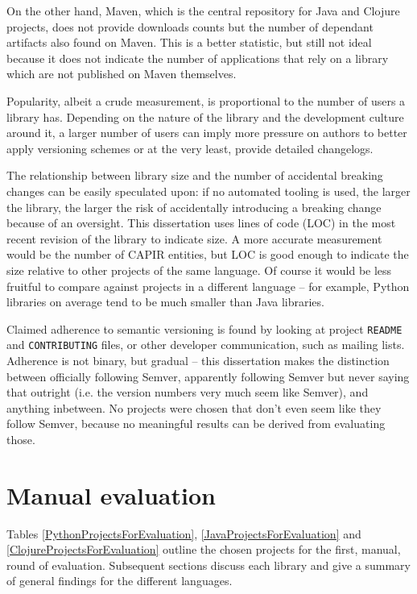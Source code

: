 \documentclass{l4proj}
\newcommand\genericstyle{\lstset{basicstyle=\ttm}}
\newcommand\codeinline[1]{{\genericstyle\lstinline!#1!}}
\begin{document}
On the other hand, Maven, which is the central repository for Java and
Clojure projects, does not provide downloads counts but the number of
dependant artifacts also found on Maven. This is a better statistic,
but still not ideal because it does not indicate the number of
applications that rely on a library which are not published on Maven
themselves.

Popularity, albeit a crude measurement, is proportional to the number
of users a library has. Depending on the nature of the library and the
development culture around it, a larger number of users can imply more
pressure on authors to better apply versioning schemes or at the very
least, provide detailed changelogs.

The relationship between library size and the number of accidental
breaking changes can be easily speculated upon: if no automated
tooling is used, the larger the library, the larger the risk of
accidentally introducing a breaking change because of an oversight.
This dissertation uses lines of code (LOC) in the most recent revision
of the library to indicate size. A more accurate measurement would be
the number of CAPIR entities, but LOC is good enough to indicate the
size relative to other projects of the same language. Of course it
would be less fruitful to compare against projects in a different
language -- for example, Python libraries on average tend to be much
smaller than Java libraries.

Claimed adherence to semantic versioning is found by looking at
project \codeinline{README} and \codeinline{CONTRIBUTING} files, or
other developer communication, such as mailing lists. Adherence is not
binary, but gradual -- this dissertation makes the distinction between
officially following Semver, apparently following Semver but never
saying that outright (i.e. the version numbers very much seem like
Semver), and anything inbetween. No projects were chosen that don't
even seem like they follow Semver, because no meaningful results can
be derived from evaluating those.

\section{Manual evaluation}

Tables \ref{PythonProjectsForEvaluation},
\ref{JavaProjectsForEvaluation} and \ref{ClojureProjectsForEvaluation}
outline the chosen projects for the first, manual, round of
evaluation. Subsequent sections discuss each library and give a
summary of general findings for the different languages.
\end{document}
